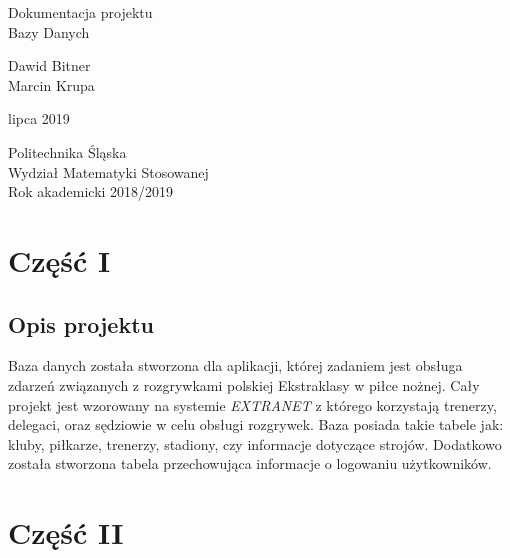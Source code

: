 \documentclass[12pt,a4paper]{article}
\begin{document}
    \begin{titlepage}
       \begin{center}
           \vspace*{1cm}
           
           {\fontsize{23}{25}\selectfont Dokumentacja projektu\\Bazy Danych}
     
            \vspace{1.0cm}
        
            {\fontsize{17}{18}\selectfont Dawid Bitner \\ Marcin Krupa}
           
            \vspace{0.4cm}
           
            {\fontsize{12}{13} lipca 2019}
           
            \vfill
            \vspace{0.8cm}
     
            {\fontsize{13}{14}\selectfont Politechnika Śląska\\Wydział Matematyki Stosowanej\\Rok akademicki 2018/2019}
     
       \end{center}
    \end{titlepage}
	\newpage
	\tableofcontents
	\newpage
	\section{Część I}
	\subsection{Opis projektu}
        Baza danych została stworzona dla aplikacji, której zadaniem jest obsługa zdarzeń związanych z rozgrywkami polskiej Ekstraklasy w piłce nożnej. Cały projekt jest wzorowany na systemie \textit{EXTRANET}  z którego korzystają trenerzy, delegaci, oraz sędziowie w celu obsługi rozgrywek. Baza posiada takie tabele jak: kluby, piłkarze, trenerzy, stadiony, czy informacje dotyczące strojów. Dodatkowo została stworzona tabela przechowująca informacje o logowaniu użytkowników.
        
    \section{Część II}
\end{document}
